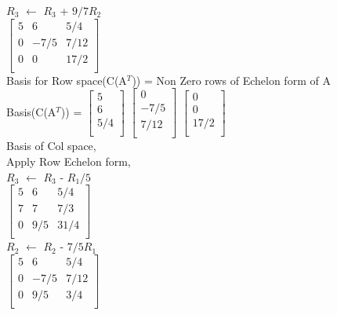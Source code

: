 \documentclass{article}
\begin{document}
$R_3$ $\leftarrow$ $R_3$ + $9/7R_2$\\

$\begin{bmatrix}
    5 & 6 & 5/4\\
    0 & -7/5 & 7/12 \\
    0 & 0 & 17/2  \\
    \end{bmatrix}$ \\

Basis for Row space(C(A$^T$)) = Non Zero rows of Echelon form of A \\

Basis(C(A$^T$)) = $\begin{bmatrix}
    5 \\
    6 \\
    5/4 \\
    \end{bmatrix}$   $\begin{bmatrix}
    0 \\
    -7/5 \\
    7/12 \\
    \end{bmatrix}$  $\begin{bmatrix}
    0 \\
    0 \\
    17/2 \\
    \end{bmatrix}$ \\

Basis of Col space,\\

Apply Row Echelon form, \\

$R_3$ $\leftarrow$ $R_3$ - $R_1/5$\\

$\begin{bmatrix}
    5 & 6 & 5/4\\
    7 & 7 & 7/3 \\
    0 & 9/5 & 31/4  \\
    \end{bmatrix}$ \\

$R_2$ $\leftarrow$ $R_2$ - $7/5R_1$\\

$\begin{bmatrix}
    5 & 6 & 5/4\\
    0 & -7/5 & 7/12 \\
    0 & 9/5 & 3/4  \\
    \end{bmatrix}$ \\
    
\end{document}
